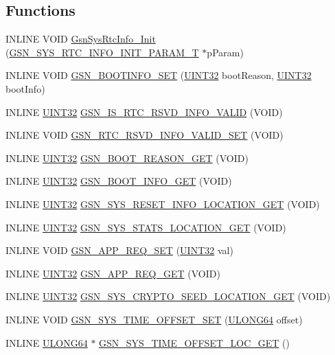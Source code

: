 \subsection*{Functions}
\begin{DoxyCompactItemize}
\item 
INLINE VOID \hyperlink{a00595_af140d8e44e9509ad2280031fce87f52f}{GsnSysRtcInfo\_\-Init} (\hyperlink{a00259}{GSN\_\-SYS\_\-RTC\_\-INFO\_\-INIT\_\-PARAM\_\-T} $\ast$pParam)
\item 
INLINE VOID \hyperlink{a00595_a39eb550aadad243cfca62fc631cfd128}{GSN\_\-BOOTINFO\_\-SET} (\hyperlink{a00660_gae1e6edbbc26d6fbc71a90190d0266018}{UINT32} bootReason, \hyperlink{a00660_gae1e6edbbc26d6fbc71a90190d0266018}{UINT32} bootInfo)
\item 
INLINE \hyperlink{a00660_gae1e6edbbc26d6fbc71a90190d0266018}{UINT32} \hyperlink{a00595_a05f46d13cfdcc394dcf70ecc82b1771f}{GSN\_\-IS\_\-RTC\_\-RSVD\_\-INFO\_\-VALID} (VOID)
\item 
INLINE VOID \hyperlink{a00595_ac8b05b8e89ded06594074a0386c1db24}{GSN\_\-RTC\_\-RSVD\_\-INFO\_\-VALID\_\-SET} (VOID)
\item 
INLINE \hyperlink{a00660_gae1e6edbbc26d6fbc71a90190d0266018}{UINT32} \hyperlink{a00595_a37568c3c50f44e2afdf150a98a0925a1}{GSN\_\-BOOT\_\-REASON\_\-GET} (VOID)
\item 
INLINE \hyperlink{a00660_gae1e6edbbc26d6fbc71a90190d0266018}{UINT32} \hyperlink{a00595_a7fced0a4ac6a66a844a36f57dc25d0ac}{GSN\_\-BOOT\_\-INFO\_\-GET} (VOID)
\item 
INLINE \hyperlink{a00660_gae1e6edbbc26d6fbc71a90190d0266018}{UINT32} \hyperlink{a00595_a3ceb648d06aa927b3e5cd3f9e1275764}{GSN\_\-SYS\_\-RESET\_\-INFO\_\-LOCATION\_\-GET} (VOID)
\item 
INLINE \hyperlink{a00660_gae1e6edbbc26d6fbc71a90190d0266018}{UINT32} \hyperlink{a00595_a00d95ee661fe7e23c37422c13a5ff9cb}{GSN\_\-SYS\_\-STATS\_\-LOCATION\_\-GET} (VOID)
\item 
INLINE VOID \hyperlink{a00595_aab1eb94962bf00e372394bd8dee105fa}{GSN\_\-APP\_\-REQ\_\-SET} (\hyperlink{a00660_gae1e6edbbc26d6fbc71a90190d0266018}{UINT32} val)
\item 
INLINE \hyperlink{a00660_gae1e6edbbc26d6fbc71a90190d0266018}{UINT32} \hyperlink{a00595_aad92fc6c06998d9cebee9964282736b9}{GSN\_\-APP\_\-REQ\_\-GET} (VOID)
\item 
INLINE \hyperlink{a00660_gae1e6edbbc26d6fbc71a90190d0266018}{UINT32} \hyperlink{a00595_a481879f9b4ffd36ce8c297420e6dd0fe}{GSN\_\-SYS\_\-CRYPTO\_\-SEED\_\-LOCATION\_\-GET} (VOID)
\item 
INLINE VOID \hyperlink{a00595_a850fc46df8147bde93528263087aabbd}{GSN\_\-SYS\_\-TIME\_\-OFFSET\_\-SET} (\hyperlink{a00660_ga28961430434ccabca6862ea93fe9a15b}{ULONG64} offset)
\item 
INLINE \hyperlink{a00660_ga28961430434ccabca6862ea93fe9a15b}{ULONG64} $\ast$ \hyperlink{a00595_aea7f7049b52ed61dff623083b7056349}{GSN\_\-SYS\_\-TIME\_\-OFFSET\_\-LOC\_\-GET} ()
\end{DoxyCompactItemize}


